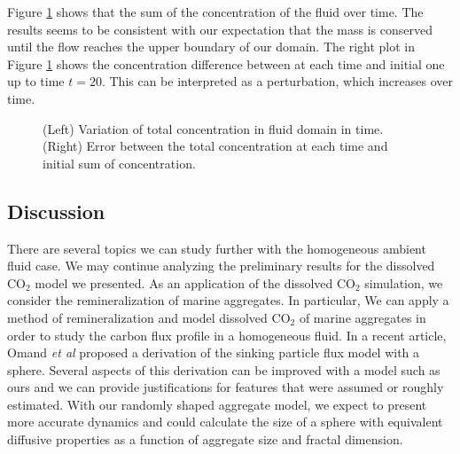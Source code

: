 Figure \ref{fig_sumC} shows that the sum of the concentration of the fluid over time.
The results seems to be consistent with our expectation that the mass is conserved until the flow reaches the upper boundary of our domain. The right plot in Figure \ref{fig_sumC} shows the concentration difference between at each time and initial one up to time $t = 20$. This can be interpreted as a perturbation, which increases over time.  
 \begin{figure}[ht]
 \begin{center}
 \end{center}
 \caption{(Left) Variation of total concentration in fluid domain in time. (Right) Error between the total concentration at each time and initial sum of concentration.}
 \label{fig_sumC}
 \end{figure}
 \subsection{Discussion}
 
 There are several topics we can study further with the homogeneous ambient fluid case. We may continue analyzing the preliminary results for the dissolved CO$_2$ model we presented.
 As an application of the dissolved CO$_2$ simulation, we consider the remineralization of marine aggregates. In particular, We can apply a method of remineralization and model dissolved CO$_2$ of marine aggregates in order to study the carbon flux profile in a homogeneous fluid.
 In a recent article, Omand {\it{et al}} \cite{omand_sinking_2020} proposed a derivation of the sinking particle flux model with a sphere.
 Several aspects of this derivation can be improved with a model such as ours and we can provide justifications for features that were assumed or roughly estimated.
  With our randomly shaped aggregate model, we expect to present more accurate dynamics and could calculate the size of a sphere with equivalent diffusive properties as a function of aggregate size and fractal dimension.
